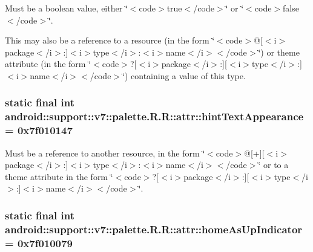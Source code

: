 Must be a boolean value, either \char`\"{}$<$code$>$true$<$/code$>$\char`\"{} or \char`\"{}$<$code$>$false$<$/code$>$\char`\"{}. 

This may also be a reference to a resource (in the form \char`\"{}$<$code$>$@\mbox{[}$<$i$>$package$<$/i$>$:\mbox{]}$<$i$>$type$<$/i$>$:$<$i$>$name$<$/i$>$$<$/code$>$\char`\"{}) or theme attribute (in the form \char`\"{}$<$code$>$?\mbox{[}$<$i$>$package$<$/i$>$:\mbox{]}\mbox{[}$<$i$>$type$<$/i$>$:\mbox{]}$<$i$>$name$<$/i$>$$<$/code$>$\char`\"{}) containing a value of this type. \hypertarget{classandroid_1_1support_1_1v7_1_1palette_1_1_r_1_1attr_5eea5d045f2fe7d78c625be40aa9029f}{
\subsubsection[{hintTextAppearance}]{\setlength{\rightskip}{0pt plus 5cm}static final int android::support::v7::palette.R.R::attr::hintTextAppearance = 0x7f010147}}
\label{classandroid_1_1support_1_1v7_1_1palette_1_1_r_1_1attr_5eea5d045f2fe7d78c625be40aa9029f}


Must be a reference to another resource, in the form \char`\"{}$<$code$>$@\mbox{[}+\mbox{]}\mbox{[}$<$i$>$package$<$/i$>$:\mbox{]}$<$i$>$type$<$/i$>$:$<$i$>$name$<$/i$>$$<$/code$>$\char`\"{} or to a theme attribute in the form \char`\"{}$<$code$>$?\mbox{[}$<$i$>$package$<$/i$>$:\mbox{]}\mbox{[}$<$i$>$type$<$/i$>$:\mbox{]}$<$i$>$name$<$/i$>$$<$/code$>$\char`\"{}. \hypertarget{classandroid_1_1support_1_1v7_1_1palette_1_1_r_1_1attr_b92d97d50de8ac081a17fae863e0d2cc}{
\subsubsection[{homeAsUpIndicator}]{\setlength{\rightskip}{0pt plus 5cm}static final int android::support::v7::palette.R.R::attr::homeAsUpIndicator = 0x7f010079}}
\label{classandroid_1_1support_1_1v7_1_1palette_1_1_r_1_1attr_b92d97d50de8ac081a17fae863e0d2cc}


